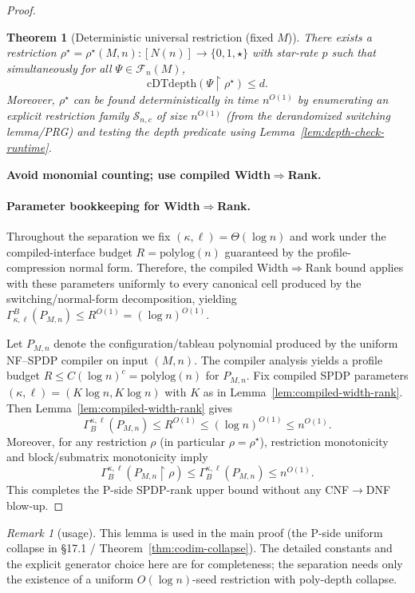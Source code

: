 \documentclass[12pt]{article}
\newtheorem{theorem}{Theorem}
\theoremstyle{definition}
\theoremstyle{definition}
\theoremstyle{remark}
\newtheorem{remark}{Remark}
\theoremstyle{remark}
\begin{document}
\begin{proof}
\begin{theorem}[Deterministic universal restriction (fixed $M$)]
There exists a restriction $\rho^\star=\rho^\star(M,n):[N(n)]\to\{0,1,\star\}$ with star-rate $p$
such that simultaneously for all $\Psi\in \mathcal{F}_n(M)$,
\[
\mathrm{cDTdepth}(\Psi\upharpoonright \rho^\star)\le d.
\]
Moreover, $\rho^\star$ can be found deterministically in time $n^{O(1)}$ by enumerating an explicit
restriction family $\mathcal{S}_{n,c}$ of size $n^{O(1)}$ (from the derandomized switching lemma/PRG) and
testing the depth predicate using Lemma~\ref{lem:depth-check-runtime}.
\end{theorem}

\item \textbf{Avoid monomial counting; use compiled Width$\Rightarrow$Rank.}

\paragraph{Parameter bookkeeping for Width$\Rightarrow$Rank.}
Throughout the separation we fix $(\kappa,\ell)=\Theta(\log n)$ and work under the
compiled-interface budget $R=\mathrm{polylog}(n)$ guaranteed by the profile-compression
normal form. Therefore, the compiled Width$\Rightarrow$Rank bound applies with these
parameters uniformly to every canonical cell produced by the switching/normal-form
decomposition, yielding $\Gamma^{B}_{\kappa,\ell}(P_{M,n}) \le R^{O(1)}=(\log n)^{O(1)}$.

Let $P_{M,n}$ denote the configuration/tableau polynomial produced by the uniform
NF--SPDP compiler on input $(M,n)$.
The compiler analysis yields a profile budget $R \le C(\log n)^c = \mathrm{polylog}(n)$ for $P_{M,n}$.
Fix compiled SPDP parameters $(\kappa,\ell)=(K\log n,K\log n)$ with $K$ as in
Lemma~\ref{lem:compiled-width-rank}.
Then Lemma~\ref{lem:compiled-width-rank} gives
\[
\Gamma^{\kappa,\ell}_B(P_{M,n}) \le R^{O(1)} \le (\log n)^{O(1)} \le n^{O(1)}.
\]
Moreover, for any restriction $\rho$ (in particular $\rho=\rho^\star$),
restriction monotonicity and block/submatrix monotonicity imply
\[
\Gamma^{\kappa,\ell}_B(P_{M,n}\upharpoonright \rho) \le \Gamma^{\kappa,\ell}_B(P_{M,n}) \le n^{O(1)}.
\]
This completes the P-side SPDP-rank upper bound without any CNF$\to$DNF blow-up.
\end{proof}

\begin{remark}[usage]
This lemma is used in the main proof (the P-side uniform collapse in \S17.1 / Theorem~\ref{thm:codim-collapse}). The detailed constants and the explicit generator choice here are for completeness; the separation needs only the existence of a uniform $O(\log n)$-seed restriction with poly-depth collapse.
\end{remark}
\end{document}
